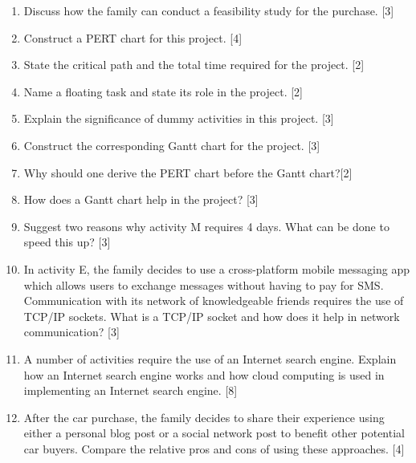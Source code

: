 \begin{enumerate}
\item Discuss how the family can conduct a feasibility study for the purchase.\hfill{}
{[}3{]}
\item Construct a PERT chart for this project. \hfill{}{[}4{]}
\item State the critical path and the total time required for the project.
\hfill{}{[}2{]}
\item Name a floating task and state its role in the project.\hfill{} {[}2{]}
\item Explain the significance of dummy activities in this project.\hfill{}
{[}3{]}
\item Construct the corresponding Gantt chart for the project. \hfill{}{[}3{]}
\item Why should one derive the PERT chart before the Gantt chart?\hfill{}{[}2{]}
\item How does a Gantt chart help in the project?\hfill{} {[}3{]}
\item Suggest two reasons why activity M requires 4 days. What can be done
to speed this up?\hfill{} {[}3{]}
\item In activity E, the family decides to use a cross-platform mobile messaging
app which allows users to exchange messages without having to pay
for SMS. Communication with its network of knowledgeable friends requires
the use of TCP/IP sockets. What is a TCP/IP socket and how does it
help in network communication? \hfill{}{[}3{]}
\item A number of activities require the use of an Internet search engine.
Explain how an Internet search engine works and how cloud computing
is used in implementing an Internet search engine. \hfill{}{[}8{]}
\item After the car purchase, the family decides to share their experience
using either a personal blog post or a social network post to benefit
other potential car buyers. Compare the relative pros and cons of
using these approaches. \hfill{}{[}4{]}
\end{enumerate}
